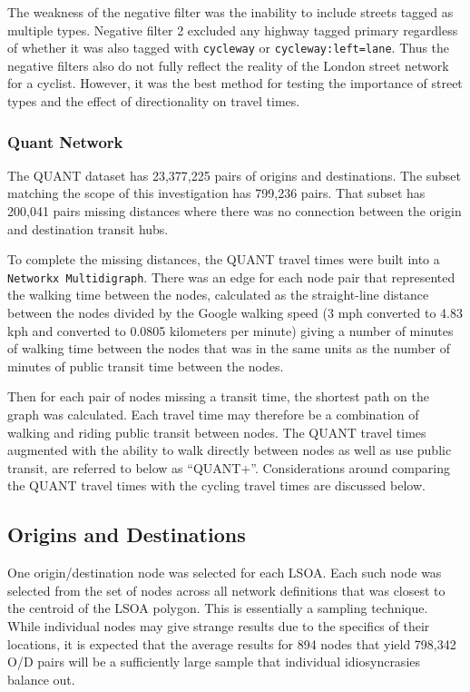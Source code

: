 The weakness of the negative filter was the inability to include streets tagged as multiple types. Negative filter 2 excluded any highway tagged primary regardless of whether it was also tagged with \texttt{cycleway} or \texttt{cycleway:left=lane}. Thus the negative filters also do not fully reflect the reality of the London street network for a cyclist. However, it was the best method for testing the importance of street types and the effect of directionality on travel times.  


\subsubsection{Quant Network}

The QUANT dataset has 23,377,225 pairs of origins and destinations. The subset matching the scope of this investigation has 799,236 pairs. That subset has 200,041 pairs missing distances where there was no connection between the origin and destination transit hubs.

To complete the missing distances, the QUANT travel times were built into a \texttt{Networkx Multidigraph}. There was an edge for each node pair that represented the walking time between the nodes, calculated as the straight-line distance between the nodes divided by the Google walking speed (3 mph converted to 4.83 kph and converted to 0.0805 kilometers per minute) giving a number of minutes of walking time between the nodes that was in the same units as the number of minutes of public transit time between the nodes. 

Then for each pair of nodes missing a transit time, the shortest path on the graph was calculated. Each travel time may therefore be a combination of walking and riding public transit between nodes. The QUANT travel times augmented with the ability to walk directly between nodes as well as use public transit, are referred to below as ``QUANT+''. Considerations around comparing the QUANT travel times with the cycling travel times are discussed below. 

\subsection{Origins and Destinations}

One origin/destination node was selected for each LSOA. Each such node was selected from the set of nodes across all network definitions that was closest to the centroid of the LSOA polygon. This is essentially a sampling technique. While individual nodes may give strange results due to the specifics of their locations, it is expected that the average results for 894 nodes that yield 798,342 O/D pairs will be a sufficiently large sample that individual idiosyncrasies balance out. 

